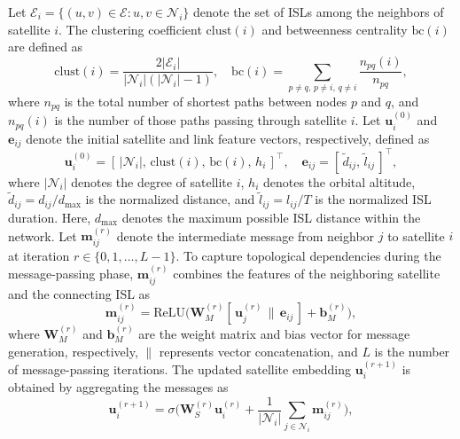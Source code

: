 Let $\mathcal{E}_i = \{(u,v) \in \mathcal{E} : u,v \in \mathcal{N}_i\}$ denote the set of ISLs among the neighbors of satellite $i$. The clustering coefficient $\mathrm{clust}(i)$ and betweenness centrality $\mathrm{bc}(i)$ are defined as
\begin{equation}
    \mathrm{clust}(i) = \frac{2 |\mathcal{E}_i|}{|\mathcal{N}_i|(|\mathcal{N}_i|-1)}, \quad \mathrm{bc}(i) = \sum_{p \neq q,\, p \neq i,\, q \neq i} \frac{n_{pq}(i)}{n_{pq}},
\end{equation}
where $n_{pq}$ is the total number of shortest paths between nodes $p$ and $q$, and $n_{pq}(i)$ is the number of those paths passing through satellite $i$.
Let $\mathbf{u}_i^{(0)}$ and $\mathbf{e}_{ij}$ denote the initial satellite and link feature vectors, respectively, defined as
\begin{equation}
    \mathbf{u}_i^{(0)} = [\, |\mathcal{N}_i|,\, \mathrm{clust}(i),\, \mathrm{bc}(i),\, h_i \,]^\top, \quad \mathbf{e}_{ij} = [\, \tilde{d}_{ij},\, \tilde{l}_{ij} \,]^\top,
\end{equation}
where $|\mathcal{N}_i|$ denotes the degree of satellite $i$, $h_i$ denotes the orbital altitude, $\tilde{d}_{ij} = d_{ij}/d_{\max}$ is the normalized distance, and $\tilde{l}_{ij} = l_{ij}/T$ is the normalized ISL duration. Here, $d_{\max}$ denotes the maximum possible ISL distance within the network.
Let $\mathbf{m}_{ij}^{(r)}$ denote the intermediate message from neighbor $j$ to satellite $i$ at iteration $r \in \{0, 1, \dots, L-1\}$. To capture topological dependencies during the message-passing phase, $\mathbf{m}_{ij}^{(r)}$ combines the features of the neighboring satellite and the connecting ISL as
\begin{equation} \label{eq:message}
    \mathbf{m}_{ij}^{(r)} = \mathrm{ReLU} \Big( \mathbf{W}_M^{(r)} [\, \mathbf{u}_j^{(r)} \,\|\, \mathbf{e}_{ij} \,] + \mathbf{b}_M^{(r)} \Big),
\end{equation}
where $\mathbf{W}_M^{(r)}$ and $\mathbf{b}_M^{(r)}$ are the weight matrix and bias vector for message generation, respectively, $\|$ represents vector concatenation, and $L$ is the number of message-passing iterations.
The updated satellite embedding $\mathbf{u}_i^{(r+1)}$ is obtained by aggregating the messages as
\begin{equation} \label{eq:satellite_update}
    \mathbf{u}_i^{(r+1)} = \sigma \Bigg( \mathbf{W}_S^{(r)} \mathbf{u}_i^{(r)} + \frac{1}{|\mathcal{N}_i|} \sum_{j \in \mathcal{N}_i} \mathbf{m}_{ij}^{(r)} \Bigg),
\end{equation}
